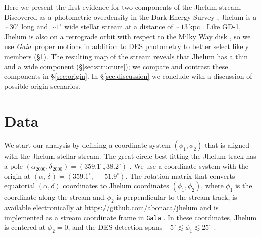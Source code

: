 \documentclass[twocolumn]{aastex62}
\newcommand{\gaia}{\textsl{Gaia}}
\begin{document}
Here we present the first evidence for two components of the Jhelum stream.
Discovered as a photometric overdensity in the Dark Energy Survey \citep[DES,][]{abbott2018}, Jhelum is a $\sim30^\circ$ long and $\sim1^\circ$ wide stellar stream at a distance of $\sim13\,$kpc \citep{shipp2018}.
Like GD-1, Jhelum is also on a retrograde orbit with respect to the Milky Way disk \citep{malhan2018}, so we use \gaia\ proper motions in addition to DES photometry to better select likely members (\S\ref{sec:data}).
The resulting map of the stream reveals that Jhelum has a thin and a wide component (\S\ref{sec:structure}); we compare and contrast these components in \S\ref{sec:origin}.
In \S\ref{sec:discussion} we conclude with a discussion of possible origin scenarios.


\section{Data}
\label{sec:data}
We start our analysis by defining a coordinate system $(\phi_1,\phi_2)$ that is aligned with the Jhelum stellar stream.
The great circle best-fitting the Jhelum track has a pole $(\alpha_{2000},\delta_{2000}) = (359.1^\circ, 38.2^\circ)$ \citep{shipp2018}.
We use a coordinate system with the origin at $(\alpha,\,\delta) = (359.1^\circ,\,-51.9^\circ)$.
The rotation matrix that converts equatorial $(\alpha, \delta)$ coordinates to Jhelum coordinates $(\phi_1, \phi_2)$, where $\phi_1$ is the coordinate along the stream and $\phi_2$ is perpendicular to the stream track, is available electronically at \url{https://github.com/abonaca/jhelum} and is implemented as a stream coordinate frame in \texttt{Gala} \citep{gala}.
In these coordinates, Jhelum is centered at $\phi_2=0$, and the DES detection spans $-5^\circ\lesssim\phi_1\lesssim25^\circ$ \citep{shipp2018}.
\end{document}
